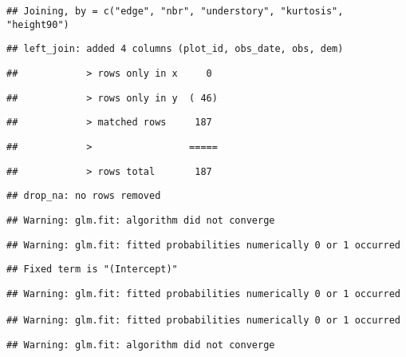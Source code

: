 \documentclass[
]{article}
\begin{document}
\begin{verbatim}
## Joining, by = c("edge", "nbr", "understory", "kurtosis", "height90")
\end{verbatim}

\begin{verbatim}
## left_join: added 4 columns (plot_id, obs_date, obs, dem)
\end{verbatim}

\begin{verbatim}
##            > rows only in x     0
\end{verbatim}

\begin{verbatim}
##            > rows only in y  ( 46)
\end{verbatim}

\begin{verbatim}
##            > matched rows     187
\end{verbatim}

\begin{verbatim}
##            >                 =====
\end{verbatim}

\begin{verbatim}
##            > rows total       187
\end{verbatim}

\begin{verbatim}
## drop_na: no rows removed
\end{verbatim}

\begin{verbatim}
## Warning: glm.fit: algorithm did not converge
\end{verbatim}

\begin{verbatim}
## Warning: glm.fit: fitted probabilities numerically 0 or 1 occurred
\end{verbatim}

\begin{verbatim}
## Fixed term is "(Intercept)"
\end{verbatim}

\begin{verbatim}
## Warning: glm.fit: fitted probabilities numerically 0 or 1 occurred

## Warning: glm.fit: fitted probabilities numerically 0 or 1 occurred
\end{verbatim}

\begin{verbatim}
## Warning: glm.fit: algorithm did not converge
\end{verbatim}
\end{document}
